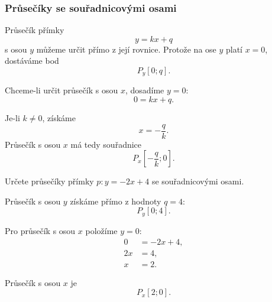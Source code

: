 \subsubsection{Průsečíky se souřadnicovými osami}
\label{subsubsec:Slope_intercept_axis_intersections}

Průsečík přímky
\[
    y=kx+q
\]
s osou $y$ můžeme určit přímo z její rovnice. Protože na ose $y$ platí
$x=0$, dostáváme bod
\begin{equation}\label{eq:Slope_intercept_y_axis_intersection}
    P_y[0;q].
\end{equation}

Chceme-li určit průsečík s osou $x$, dosadíme $y=0$:
\[
    0=kx+q.
\]

Je-li $k\neq0$, získáme
\[
    x=-\frac{q}{k}.
\]
Průsečík s osou $x$ má tedy souřadnice
\begin{equation}\label{eq:Slope_intercept_x_axis_intersection}
    P_x\left[-\frac{q}{k};0\right].
\end{equation}

\begin{example}\label{exa:Slope_intercept_axis_intersections}
    Určete průsečíky přímky $p:y=-2x+4$ se souřadnicovými osami.

    Průsečík s osou $y$ získáme přímo z hodnoty $q=4$:
    \[
        P_y[0;4].
    \]

    Pro průsečík s osou $x$ položíme $y=0$:
    \begin{align*}
        0&=-2x+4,\\
        2x&=4,\\
        x&=2.
    \end{align*}

    Průsečík s osou $x$ je
    \[
        P_x[2;0].
    \]
\end{example}